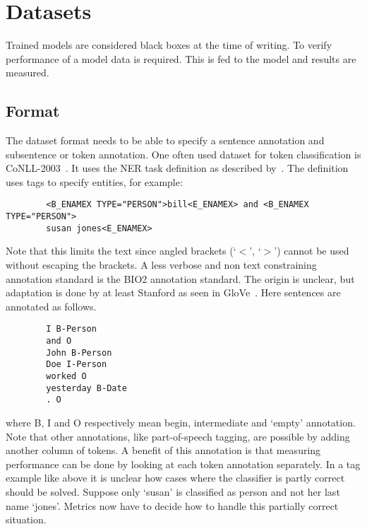 \section{Datasets}
\label{sec:datasets}
Trained models are considered black boxes at the time of writing.
To verify performance of a model data is required.
This is fed to the model and results are measured.

\subsection{Format}
\label{subsec:format}
The dataset format needs to be able to specify a sentence annotation and subsentence or token annotation.
One often used dataset for token classification is CoNLL-2003~\citep{tjong2003}.
It uses the NER task definition as described by~\citet{chinchor1999}.
The definition uses tags to specify entities, for example:
\begin{center}
    \begin{verbatim}
        <B_ENAMEX TYPE="PERSON">bill<E_ENAMEX> and <B_ENAMEX TYPE="PERSON">
        susan jones<E_ENAMEX>
    \end{verbatim}
\end{center}
Note that this limits the text since angled brackets (`$<$', `$>$') cannot be used without escaping the brackets.
A less verbose and non text constraining annotation standard is the BIO2 annotation standard.
The origin is unclear, but adaptation is done by at least Stanford as seen in GloVe~\citep{pennington2014}.
Here sentences are annotated as follows.
\begin{center}
    \begin{verbatim}
        I B-Person
        and O
        John B-Person
        Doe I-Person
        worked O
        yesterday B-Date
        . O
    \end{verbatim}
\end{center}
where B, I and O respectively mean begin, intermediate and `empty' annotation.
Note that other annotations, like part-of-speech tagging, are possible by adding another column of tokens.
A benefit of this annotation is that measuring performance can be done by looking at each token annotation separately.
In a tag example like above it is unclear how cases where the classifier is partly correct should be solved.
Suppose only `susan' is classified as person and not her last name `jones'.
Metrics now have to decide how to handle this partially correct situation.
